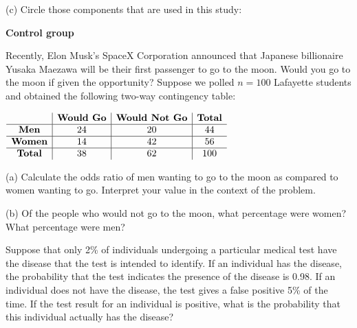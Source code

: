 \documentclass[12pt]{amsart}
\begin{document}
\begin{list}
\vspace{1in}

\subitem(c) Circle those components that are used in this study:
\begin{center}
{\bf Control group}\hspace{.2in}{\bf Placebo}\hspace{.2in}{\bf Matched-pairs design}\hspace{.2in}{\bf Randomization}
\end{center}

\newpage

\item Recently, Elon Musk's SpaceX Corporation announced that Japanese billionaire Yusaka Maezawa will be their first passenger to go to the moon.  Would you go to the moon if given the opportunity? Suppose we polled $n=100$ Lafayette students and obtained the following two-way contingency table:
\begin{center}
$\begin{array}{c|c|c|c}
 & \text{\bf Would Go} & \text{\bf Would Not Go} & \text{\bf Total}\\
 \hline
 \text{\bf Men} & 24 & 20 & 44\\
 \hline
 \text{\bf Women} & 14 & 42 & 56\\
 \hline
 \text{\bf Total} & 38 & 62 & 100\\
 \end{array}$
 \end{center}
 
 \subitem(a) Calculate the odds ratio of men wanting to go to the moon as compared to women wanting to go.  Interpret your value in the context of the problem.

\vspace{1in}

\subitem(b) Of the people who would not go to the moon, what percentage were women?  What percentage were men?

\vspace{1in}

\item Suppose that only 2\% of individuals undergoing a particular medical test have the disease that the test is intended to identify.  If an individual has the disease, the probability that the test indicates the presence of the disease is 0.98.  If an individual does not have the disease, the test gives a false positive 5\% of the time.  If the test result for an individual is positive, what is the probability that this individual actually has the disease?


\end{list}
\end{document}
